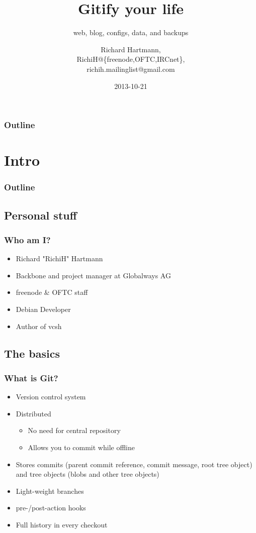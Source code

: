 \documentclass[t]{beamer}
\title{Gitify your life}
\subtitle{web, blog, configs, data, and backups}
\author{Richard Hartmann,\\
RichiH@\{freenode,OFTC,IRCnet\},\\
richih.mailinglist@gmail.com}
\date{2013-10-21}
\begin{document}
\setcounter{tocdepth}{1}

\begin{frame}
	\titlepage
\end{frame}

\begin{frame}
	\frametitle{Outline}
	\tableofcontents
\end{frame}


\section{Intro}

\begin{frame}
	\frametitle{Outline}
	\tableofcontents[currentsection]
\end{frame}

\subsection{Personal stuff}

\begin{frame}
	\frametitle{Who am I?}
	\begin{itemize}
		\item Richard "RichiH" Hartmann
		\item Backbone and project manager at Globalways AG
		\item freenode \& OFTC staff
		\item Debian Developer
		\item Author of vcsh
	\end{itemize}
\end{frame}

\subsection{The basics}

\begin{frame}
	\frametitle{What is Git?}
	\begin{itemize}
		\item Version control system
		\item Distributed
		\begin{itemize}
			\item No need for central repository
			\item Allows you to commit while offline
		\end{itemize}
		\item Stores commits (parent commit reference, commit message, root tree object) and tree objects (blobs and other tree objects)
		\item Light-weight branches
		\item pre-/post-action hooks
		\item Full history in every checkout
	\end{itemize}
\end{frame}
\end{document}
